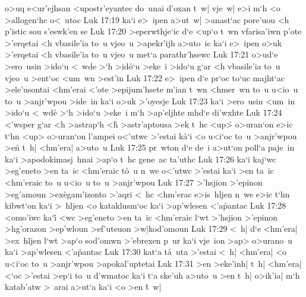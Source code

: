 o>uq
e<ur'ejhsan
<upostr'eyantec
do~unai
d'oxan
t~w|
vje~w|
e>i
m`h
<o
>allogen`hc
o<~utoc\bibvsend
\vs Luk 17:19
ka`i
e>~ipen
a>ut~w|
>anast`ac
pore'uou
<h
p'istic
sou
s'eswk'en
se\bibvsend
\vs Luk 17:20
>eperwthje`ic
d`e
<up`o
t~wn
vfarisa'iwn
p'ote
>'erqetai
<h
vbasile'ia
to~u
vjeo~u
>apekr'ijh
a>uto~ic
ka`i
e>~ipen
o>uk
>'erqetai
<h
vbasile'ia
to~u
vjeo~u
met`a
parathr'hsewc\bibvsend
\vs Luk 17:21
o>ud`e
>ero~usin
>ido`u
<~wde
>`h
>id\r{o}`u
>eke~i
>ido`u
g`ar
<h
vbasile'ia
to~u
vjeo~u
>ent`oc
<um~wn
>est'in\bibvsend
\vs Luk 17:22
e>~ipen
d`e
pr`oc
to`uc
majht`ac
>ele'usontai
<hm'erai
<'ote
>epijum'hsete
m'ian
t~wn
<hmer~wn
to~u
u<io~u
to~u
>anjr'wpou
>ide~in
ka`i
o>uk
>'oyesje\bibvsend
\vs Luk 17:23
ka`i
>ero~usin
<um~in
>ido`u
<~wde\r{}
>`h
>ido`u
>eke~i
m`h
>ap'eljhte
mhd`e
di'wxhte\bibvsend
\vs Luk 17:24
<'wsper
g`ar
<h
>astrap`h
<h\r{}
>astr'aptousa
>ek
t~hc
<up>\r{}
o>uran`on
e>ic
t`hn
<up>
o>uran`on
l'ampei
o<'utwc
>'estai
k\r{a}`i
<o
u<i`oc
to~u
>anjr'wpou
>en\r{}
t~h|
<hm'era|
a>uto~u\bibvsend
\vs Luk 17:25
pr~wton
d`e
de~i
a>ut`on
poll`a
paje~in
ka`i
>apodokimasj~hnai
>ap`o
t~hc
gene~ac
ta'uthc\bibvsend
\vs Luk 17:26
ka`i
kaj`wc
>eg'eneto
>en
ta~ic
<hm'eraic
t\r{o}~u
n~we
o<'utwc
>'estai
ka`i
>en
ta~ic
<hm'eraic
to~u
u<io~u
to~u
>anjr'wpou\bibvsend
\vs Luk 17:27
>'hsjion
>'epinon
>eg'amoun
>ex\r{e}gam'izonto
>'aqri
<~hc
<hm'erac
e>is~hljen
n~we
e>ic
t`hn
kibwt`on
ka`i
>~hljen
<o
kataklusm`oc
ka`i
>ap'wlesen
<'a\r{p}antac\bibvsend
{}
\vs Luk 17:28
<omo'iwc
ka`i\r{}
<wc
>eg'eneto
>en
ta~ic
<hm'eraic
l`wt
>'hsjion
>'epinon
>hg'orazon
>ep'wloun
>ef'uteuon
>w|kod'omoun\bibvsend
\vs Luk 17:29
<~h|
d`e
<hm'era|
>ex~hljen
l`wt
>ap`o
sod'omwn
>'ebrexen
p~ur
ka`i
vje~ion
>ap>
o>urano~u
ka`i
>ap'wlesen
<'a\r{p}antac\bibvsend
{}
\vs Luk 17:30
kat`a
t\r{a}~uta
>'estai
<~h|
<hm'era|
<o
u<i`oc
to~u
>anjr'wpou
>apokal'uptetai\bibvsend
\vs Luk 17:31
>en
>eke'inh|
t~h|
<hm'era|
<`oc
>'estai
>ep`i
to~u
d'wmatoc
ka`i
t`a
ske'uh
a>uto~u
>en
t~h|
o>ik'ia|
m`h
katab'atw
>~arai
a>ut`a
ka`i
<o
>en
\r{t}~w|

